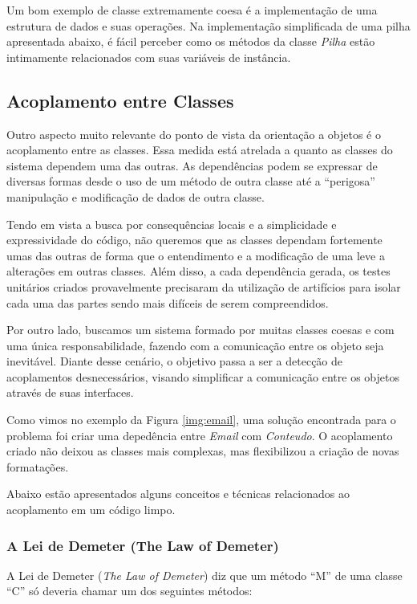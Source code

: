 Um bom exemplo de classe extremamente coesa é a implementação de uma estrutura de dados e suas operações. Na implementação 
simplificada de uma pilha apresentada abaixo, é fácil perceber como os métodos da classe \textit{Pilha} estão intimamente 
relacionados com suas variáveis de instância.



\subsection{Acoplamento entre Classes}
Outro aspecto muito relevante do ponto de vista da orientação a objetos é o acoplamento entre as classes. Essa medida 
está atrelada a quanto as classes do sistema dependem uma das outras. As dependências podem se expressar de diversas 
formas desde o uso de um método de outra classe até a ``perigosa'' manipulação e modificação de dados de outra classe.
	
Tendo em vista a busca por consequências locais e a simplicidade e expressividade do código, não queremos que as 
classes dependam fortemente umas das outras de forma que o entendimento e a modificação de uma leve a alterações em 
outras classes. Além disso, a cada dependência gerada, os testes unitários criados provavelmente precisaram da 
utilização de artifícios para isolar cada uma das partes sendo mais difíceis de serem compreendidos.

Por outro lado, buscamos um sistema formado por muitas classes coesas e com uma única responsabilidade, fazendo com a comunicação 
entre os objeto seja inevitável. Diante desse cenário, o objetivo passa a ser a detecção de acoplamentos desnecessários, visando 
simplificar a comunicação entre os objetos através de suas interfaces.

Como vimos no exemplo da Figura \ref{img:email}, uma solução encontrada para o problema foi criar uma depedência entre \textit{Email} 
com \textit{Conteudo}. O acoplamento criado não deixou as classes mais complexas, mas flexibilizou a criação de novas formatações.

Abaixo estão apresentados alguns conceitos e técnicas relacionados ao acoplamento em um código limpo.

\subsubsection{A Lei de Demeter (The Law of Demeter)}
A Lei de Demeter (\textit{The Law of Demeter}) diz que um método ``M'' de uma classe ``C'' só deveria chamar um dos 
seguintes métodos:

